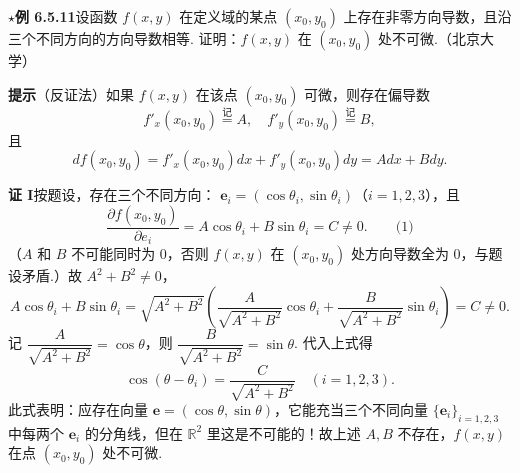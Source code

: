 \documentclass[UTF8, 12pt, fontset=fandol, oneside]{ctexart}
\begin{document}
\noindent\textbf{\ensuremath{\star}例 6.5.11}\quad 设函数 $f(x,y)$ 在定义域的某点 $(x_0,y_0)$ 上存在非零方向导数，且沿三个不同方向的方向导数相等. 证明：$f(x,y)$ 在 $(x_0,y_0)$ 处不可微.（北京大学）

\noindent\textbf{提示}\quad （反证法）如果 $f(x,y)$ 在该点 $(x_0,y_0)$ 可微，则存在偏导数
\[
  f'_x(x_0,y_0)\overset{\text{记}}{=}A,\quad
  f'_y(x_0,y_0)\overset{\text{记}}{=}B,
\]
且
\[
  df(x_0,y_0)=f'_x(x_0,y_0)dx+f'_y(x_0,y_0)dy=Adx+Bdy.
\]

\noindent\textbf{证 I}\quad 按题设，存在三个不同方向：
$\mathbf e_i=(\cos\theta_i,\sin\theta_i)$（$i=1,2,3$），且
\[
  \frac{\partial f(x_0,y_0)}{\partial e_i}
  =
  A\cos\theta_i+B\sin\theta_i=C\ne0. \qquad\text{(1)}
\]
（$A$ 和 $B$ 不可能同时为 $0$，否则 $f(x,y)$ 在 $(x_0,y_0)$ 处方向导数全为 $0$，与题设矛盾.）故 $A^2+B^2\ne0$，
\[
  A\cos\theta_i+B\sin\theta_i
  =
  \sqrt{A^2+B^2}\left(
  \frac A{\sqrt{A^2+B^2}}\cos\theta_i+
  \frac B{\sqrt{A^2+B^2}}\sin\theta_i
  \right)
  =C\ne0.
\]
记 $\dfrac A{\sqrt{A^2+B^2}}=\cos\theta$，则
$\dfrac B{\sqrt{A^2+B^2}}=\sin\theta$. 代入上式得
\[
  \cos(\theta-\theta_i)=\frac C{\sqrt{A^2+B^2}}\quad(i=1,2,3).
\]
此式表明：应存在向量 $\mathbf e=(\cos\theta,\sin\theta)$，它能充当三个不同向量
$\{\mathbf e_i\}_{i=1,2,3}$ 中每两个 $\mathbf e_i$ 的分角线，但在 $\mathbb R^2$ 里这是不可能的！故上述 $A,B$ 不存在，$f(x,y)$ 在点 $(x_0,y_0)$ 处不可微.
\end{document}
